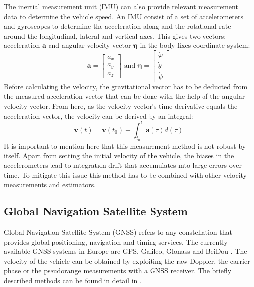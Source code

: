 The inertial measurement unit (IMU) can also provide relevant measurement data to determine the vehicle speed. An IMU consist of a set of accelerometers and gyroscopes to determine the acceleration along and the rotational rate around the longitudinal, lateral and vertical axes. This gives two vectors: acceleration $\textbf{a}$ and angular velocity vector $\boldsymbol{\dot \eta}$ in the body fixes coordinate system:
\begin{equation}
    \textbf{a} = \begin{bmatrix}
        a_x \\ a_y \\ a_z 
    \end{bmatrix}
    \text{ and }
    \boldsymbol{\dot \eta} = 
    \begin{bmatrix}
        \dot \varphi \\ \dot \theta  \\ \dot \psi
    \end{bmatrix}
\end{equation}
Before calculating the velocity, the gravitational vector has to be deducted from the measured acceleration vector that can be done with the help of the angular velocity vector. From here, as the velocity vector's time derivative equals the acceleration vector, the velocity can be derived by an integral:
\begin{equation}
    \textbf{v}(t) = \textbf{v}(t_0) + \int_{t_0}^{t} \textbf{a}(\tau) d(\tau)
\end{equation}
It is important to mention here that this measurement method is not robust by itself. Apart from setting the initial velocity of the vehicle, the biases in the accelerometers lead to integration drift that accumulates into large errors over time. To mitigate this issue this method has to be combined with other velocity measurements and estimators.

\subsection{Global Navigation Satellite System}
\label{subsec:GNSS}

Global Navigation Satellite System (GNSS) refers to any constellation that provides global positioning, navigation and timing services. The currently available GNSS systems in Europe are GPS, Galileo, Glonass and BeiDou \cite{GNSS}. The velocity of the vehicle can be obtained by exploiting the raw Doppler, the carrier phase or the pseudorange measurements with a GNSS receiver. The briefly described methods can be found in detail in \cite{GNNS_book}.

